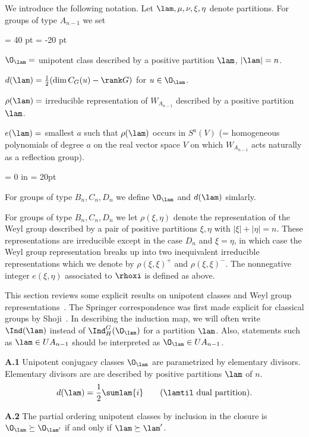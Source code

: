 We introduce the following notation.  Let $\lam,\mu,\nu,\xi,\eta$ denote
partitions.  For groups of type $A_{n-1}$ we set

\leftskip = 40 pt
\parindent = -20 pt

$\O_\lam =$ unipotent class described by a positive partition $\lam$, 
	$|\lam| = n$.
	
$d(\lam) = \frac 12 (\dim C_G(u) - \rank G)$ for $u\in \O_\lam$.

$\rho(\lam) =$ irreducible representation of $W_{A_{n-1}}$ described by a
	positive partition $\lam$.

$e(\lam) =$ smallest $a$ such that $\rho(\lam)$ occurs in $S^a(V)$
	(= homogeneous polynomials of degree $a$ on the real vector space $V$
	on which $W_{A_{n-1}}$ acts naturally as a reflection group).

\leftskip = 0 in
\parindent = 20pt

For groups of type $B_n, C_n, D_n$ we define $\O_\lam$ and $d(\lam)$ 
simlarly.

For groups of type $B_n, C_n, D_n$ we let $\rho(\xi,\eta)$ denote the
representation of the Weyl group described by a pair of positive partitions
$\xi,\eta$ with $|\xi| + |\eta| = n$.  These representations are irreducible
except in the case $D_n$ and $\xi = \eta$, in which case the Weyl group 
representation breaks up into two inequivalent irreducible representations 
which we denote by $\rho(\xi,\xi)^+$ and $\rho(\xi,\xi)^-$.  The nonnegative
integer $e(\xi,\eta)$ associated to $\rhoxi$ is defined as above.

This section reviews some explicit results on unipotent classes and Weyl group
representations~.  The Springer correspondence was first
made explicit for classical groups by Shoji~\cite{Sh1}.  In describing the
induction map, we will often write $\Ind (\lam)$ instead of 
$\Ind_H^G(\O_\lam)$ for a partition $\lam$.  Also, statements such as
$\lam \in UA_{n-1}$ should be interpreted as $\O_\lam \in UA_{n-1}$.


\noindent
{\bf A.1} \qquad Unipotent conjugacy classes $\O_\lam$ are parametrized by 
elementary divisors.  Elementary divisors are are described by positive
partitions $\lam$ of $n$.
	$$
	d(\lam) = \frac 12 \sumlam{i} \qquad
	(\lamtil \text{ dual partition}).
	$$

\noindent
{\bf A.2} \qquad The partial ordering unipotent classes by inclusion in the 
closure is $\O_\lam \succeq \O_{\lam'}$ if and only if $\lam \succeq \lam'$.

